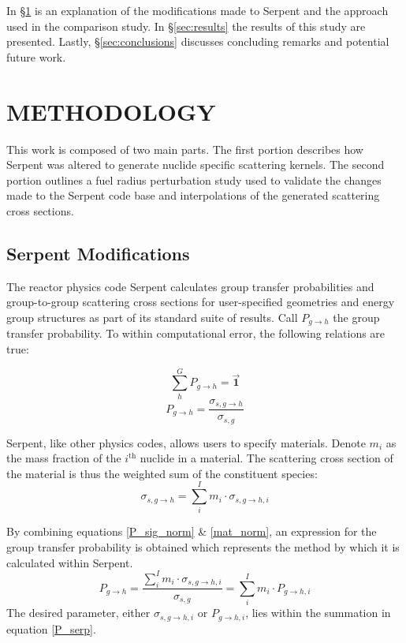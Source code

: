 \documentclass{physor2012}
\newcommand{\superscript}[1]{\ensuremath{^{\textrm{#1}}}}
\begin{document}
In \S \ref{sec:methodology} is an explanation of the modifications made to Serpent
and the approach used in the comparison study.  In \S \ref{sec:results} the
results of this study are presented.  Lastly, \S \ref{sec:conclusions}
discusses concluding remarks and potential future work.

\section{METHODOLOGY}
\label{sec:methodology}

This work is composed of two main parts.  The first portion describes how
Serpent was altered to generate nuclide specific scattering kernels.
The second portion outlines a fuel radius perturbation study used to
validate the changes made to the Serpent code base and interpolations of the
generated scattering cross sections.

\subsection{Serpent Modifications}

The reactor physics code Serpent calculates group transfer probabilities and
group-to-group scattering cross sections for user-specified geometries and energy
group structures as part of its standard suite of results.   Call $P_{g\to h}$
the group transfer probability.  To within computational error, the following
relations are true:

\begin{equation}\label{P_h_norm}\sum_h^G P_{g\to h} = \mathbf{\vec{1}}\end{equation}
\begin{equation}\label{P_sig_norm}P_{g\to h} = \frac{\sigma_{s,g\to h}}{\sigma_{s,g}}\end{equation}

Serpent, like other physics codes, allows users to specify materials.
Denote $m_i$ as the mass fraction of the $i$\superscript{th} nuclide
in a material.  The scattering cross section of the material is thus
the weighted sum of the constituent species:
\begin{equation}\label{mat_norm}\sigma_{s,g\to h} = \sum_i^I m_i \cdot \sigma_{s,g\to h,i}\end{equation}

By combining equations \ref{P_sig_norm} \& \ref{mat_norm}, an expression for the
group transfer probability is obtained which represents the method by which it
is calculated within Serpent.
\begin{equation}
\label{P_serp}
P_{g\to h} = \frac{\sum_i^I m_i \cdot \sigma_{s,g\to h,i}}{\sigma_{s,g}} = \sum_i^I m_i \cdot P_{g\to h,i}
\end{equation}
The desired parameter, either $\sigma_{s,g\to h,i}$ or $P_{g\to h,i}$, lies within
the summation in equation \ref{P_serp}.
\end{document}
